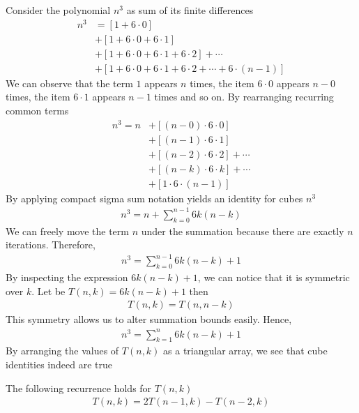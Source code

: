 Consider the polynomial $n^3$ as sum of its finite differences
\begin{align*}
    n^3
    &= [1+6\cdot0] \\
    &+ [1+6\cdot0+6\cdot1] \\
    &+ [1+6\cdot0+6\cdot1+6\cdot2] + \cdots \\
    &+ [1+6\cdot0+6\cdot1+6\cdot2+\cdots+6\cdot(n-1)]
\end{align*}
We can observe that the term $1$ appears $n$ times, the item $6\cdot0$ appears $n-0$ times,
the item $6\cdot1$ appears $n-1$ times and so on.
By rearranging recurring common terms
\begin{align*}
    n^3 = n
    &+ [(n-0) \cdot 6 \cdot 0] \\
    &+ [(n-1)\cdot6\cdot1] \\
    &+ [(n-2)\cdot6\cdot2] + \cdots \\
    &+ [(n-k)\cdot 6 \cdot k] + \cdots \\
    &+ [1\cdot6\cdot(n-1)]
\end{align*}
By applying compact sigma sum notation yields an identity for cubes $n^3$
\begin{align*}
    n^3 = n + \sum_{k=0}^{n-1} 6k(n-k)
\end{align*}
We can freely move the term $n$ under the summation because there are exactly $n$ iterations.
Therefore,
\begin{align*}
    n^3 = \sum_{k=0}^{n-1} 6k(n-k) + 1
\end{align*}
By inspecting the expression $6k(n-k) + 1$, we can notice that it is symmetric over $k$.
Let be $T(n,k) = 6k(n-k) + 1$ then
\begin{align*}
    T(n,k) = T(n,n-k)
\end{align*}
This symmetry allows us to alter summation bounds easily.
Hence,
\begin{align*}
    n^3 = \sum_{k=1}^{n} 6k(n-k) + 1
\end{align*}
By arranging the values of $T(n,k)$ as a triangular array, we see that cube identities indeed are true

The following recurrence holds for $T(n,k)$
\begin{align*}
    T(n, k) = 2T(n-1, k) - T(n-2, k)
\end{align*}
